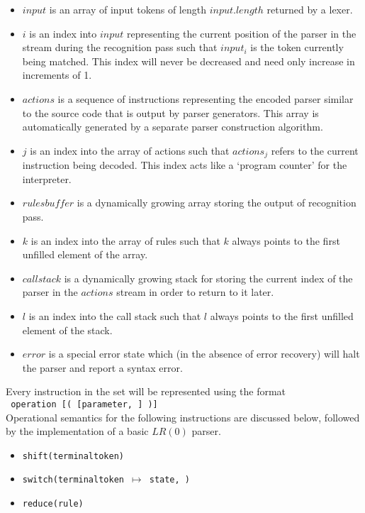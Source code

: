 \documentclass[a4paper,11pt]{article}
\begin{document}
\begin{itemize}
\item $input$ is an array of input tokens of length $input.length$ returned by a lexer.
\item $i$ is an index into $input$ representing the current position of the parser in the stream during the recognition pass such that $input_i$ is the token currently being matched.
This index will never be decreased and need only increase in increments of 1.
\item $actions$ is a sequence of instructions representing the encoded parser similar to the source code that is output by parser generators. 
This array is automatically generated by a separate parser construction algorithm.
\item $j$ is an index into the array of actions such that $actions_j$ refers to the current instruction being decoded.
This index acts like a `program counter' for the interpreter.
\item $rulesbu\!f\!f\!er$ is a dynamically growing array storing the output of recognition pass.
\item $k$ is an index into the array of rules such that $k$ always points to the first unfilled element of the array.
\item $callstack$ is a dynamically growing stack for storing the current index of the parser in the $actions$ stream in order to return to it later.
\item $l$ is an index into the call stack such that $l$ always points to the first unfilled element of the stack.
\item $error$ is a special error state which (in the absence of error recovery) will halt the parser and report a syntax error.
\end{itemize}

Every instruction in the set will be represented using the format\\ \texttt{ operation [( [parameter, \textellipsis] )]}\\

Operational semantics for the following instructions are discussed below, followed by the implementation of a basic $LR(0)$ parser.
\begin{itemize}
\item \texttt{shift(terminaltoken)}
\item \texttt{switch(terminaltoken $\mapsto$ state, \textellipsis)}
\item \texttt{reduce(rule)}
\end{itemize}
\end{document}

